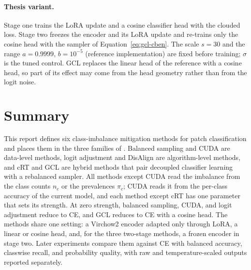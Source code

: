 \documentclass[11pt]{article}
\begin{document}
\paragraph{Thesis variant.}
Stage one trains the LoRA update and a cosine classifier head with the clouded loss. Stage two freezes the encoder and its LoRA update and re-trains only the cosine head with the sampler of Equation~\eqref{eq:gcl-cben}. The scale $s=30$ and the range $a=0.9999$, $b=10^{-5}$ (reference implementation) are fixed before training; $\sigma$ is the tuned control. GCL replaces the linear head of the reference with a cosine head, so part of its effect may come from the head geometry rather than from the logit noise.

\section{Summary}
\label{sec:summary}
This report defines six class-imbalance mitigation methods for patch classification and places them in the three families of \citet{krawczyk2016learning}. Balanced sampling and CUDA are data-level methods, logit adjustment and DisAlign are algorithm-level methods, and cRT and GCL are hybrid methods that pair decoupled classifier learning with a rebalanced sampler. All methods except CUDA read the imbalance from the class counts $n_c$ or the prevalences $\pi_c$; CUDA reads it from the per-class accuracy of the current model, and each method except cRT has one parameter that sets its strength. At zero strength, balanced sampling, CUDA, and logit adjustment reduce to CE, and GCL reduces to CE with a cosine head. The methods share one setting: a Virchow2 encoder adapted only through LoRA, a linear or cosine head, and, for the three two-stage methods, a frozen encoder in stage two. Later experiments compare them against CE with balanced accuracy, classwise recall, and probability quality, with raw and temperature-scaled outputs reported separately.

\clearpage


\end{document}
